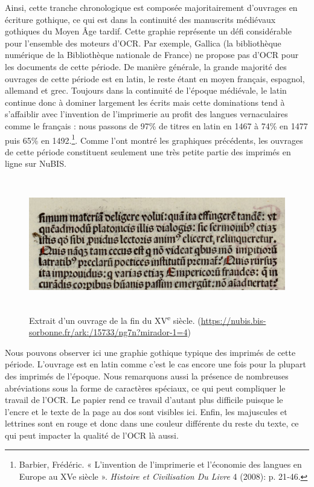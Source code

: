 \documentclass[a4paper,12pt,twoside]{book}
\begin{document}
Ainsi, cette tranche chronologique est composée majoritairement
d'ouvrages en écriture gothique, ce qui est dans la continuité des manuscrits médiévaux gothiques du Moyen Âge tardif. Cette graphie représente un
défi considérable pour l'ensemble des moteurs d'OCR. Par exemple,
Gallica (la bibliothèque numérique de la Bibliothèque nationale de France)
ne propose pas d'OCR pour les documents de cette période. De manière
générale, la grande majorité des ouvrages de cette période est en latin,
le reste étant en moyen français, espagnol, allemand et grec. Toujours dans la continuité de l'époque médiévale, le latin continue donc à dominer largement les écrits mais cette dominations tend à s'affaiblir avec l'invention de l'imprimerie au profit des langues vernaculaires comme le français : nous passons de 97\% de titres en latin en 1467 à 74\% en 1477 puis 65\% en 1492.\footnote{Barbier, Frédéric. « L’invention de l’imprimerie et l’économie des langues en Europe au XVe siècle ». \emph{Histoire et Civilisation Du Livre} 4 (2008): p. 21‑46.}. Comme l'ont montré les graphiques précédents, les ouvrages de cette période constituent seulement une
très petite partie des imprimés en ligne sur NuBIS. \\

\begin{figure} [H]
	\includegraphics[width=6.26806in,height=2.26389in]{vertopal_157ae480aa4a4b07be198b586a812241/media/image6.png}
	
	\caption{Extrait d'un ouvrage de la fin du
		XV\textsuperscript{e} siècle.
		(\url{https://nubis.bis-sorbonne.fr/ark:/15733/ng7n?mirador-1=4})}
\end{figure}

Nous pouvons observer ici une graphie gothique typique des imprimés de cette période. L'ouvrage est en latin comme c'est le cas encore une fois pour la plupart des imprimés de l'époque. Nous remarquons aussi la présence de nombreuses abréviations sous la forme de caractères spéciaux, ce qui peut compliquer le travail de l'OCR. Le papier rend ce travail d'autant plus difficile puisque le l'encre et le texte de la page au dos sont visibles ici. Enfin, les majuscules et lettrines sont en rouge et donc dans une couleur différente du reste du texte, ce qui peut impacter la qualité de l'OCR là aussi. 
\end{document}
